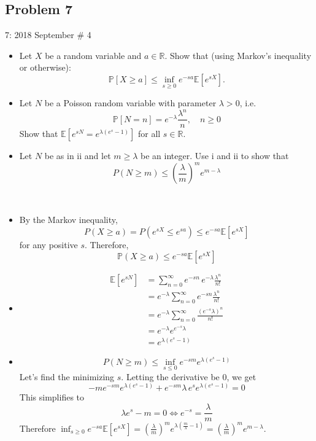 \documentclass[../main]{subfiles}
\begin{document}
\subsection{Problem 7}
\begin{bbox}{7: 2018 September \# 4}
    \begin{itemize}
        \item Let $X$ be a random variable and $a\in\mathbb R$. Show that (using Markov's inequality or otherwise):
        \[
        \mathbb P[X\ge a] \le \inf_{s\ge 0} e^{-sa}\mathbb E[e^{sX}].
        \]
        \item Let $N$ be a Poisson random variable with parameter $\lambda > 0$, i.e. 
        \[
        \mathbb P[N=n] = e^{-\lambda}\frac{\lambda^n}{n},\quad n\ge 0
        \]
        Show that $\mathbb E[e^{sN} = e^{\lambda(e^s -1)}]$ for all $s\in \mathbb R$.
        \item Let $N$ be as in ii and let $m\ge \lambda$ be an integer. Use i and ii to show that 
        \[
        P(N\ge m) \le (\frac{\lambda}{m})^m e^{m-\lambda}
        \]
    \end{itemize}
\end{bbox}
\
\begin{solution}


\begin{itemize}
    \item By the Markov inequality, 
    \[
    P(X\ge a) = P(e^{sX} \le e^{sa}) \leq e^{-sa}\mathbb E[e^{sX}]
    \]
    for any positive $s$. Therefore,
    \[
        \mathbb P(X\ge a) \le e^{-sa}\mathbb E[e^{sX}]
    \]
    \item 
    \begin{align*}
        \mathbb E[e^{sN}] &= \sum_{n=0}^\infty e^{-sn}\,e^{-\lambda}\frac{\lambda^n}{n!}\\
        &= e^{-\lambda}\sum_{n=0}^\infty e^{-sn}\frac{\lambda^n}{n!}\\
        &= e^{-\lambda}\sum_{n=0}^\infty \frac{(e^{-s}\lambda)^n}{n!}\\
        &= e^{-\lambda}e^{e^{-s}\lambda}\\
        &= e^{\lambda(e^s - 1)}
    \end{align*}
    \item 
    \[
    P(N \ge m) \le \inf_{s\le 0} e^{-sm}e^{\lambda(e^s -1)}
    \]
    Let's find the minimizing $s$.
    Letting the derivative be $0$, we get 
    \[
        -me^{-sm}e^{\lambda(e^s -1)}+e^{-sm} \lambda \, e^{s}e^{\lambda(e^s - 1)} = 0
    \]
    This simplifies to 
    \[
    \lambda e^s-m = 0 \iff e^{-s} = \frac{\lambda}{m}
    \]
    Therefore $\inf_{s\ge 0} e^{-sa}\mathbb E [e^{sX}] = \left(\frac{\lambda}{m}\right)^m e^{\lambda (\frac{m}{\lambda} -1)} = \left(\frac{\lambda}{m}\right)^m e^{m-\lambda}$.
\end{itemize}
\end{solution}
\end{document}
